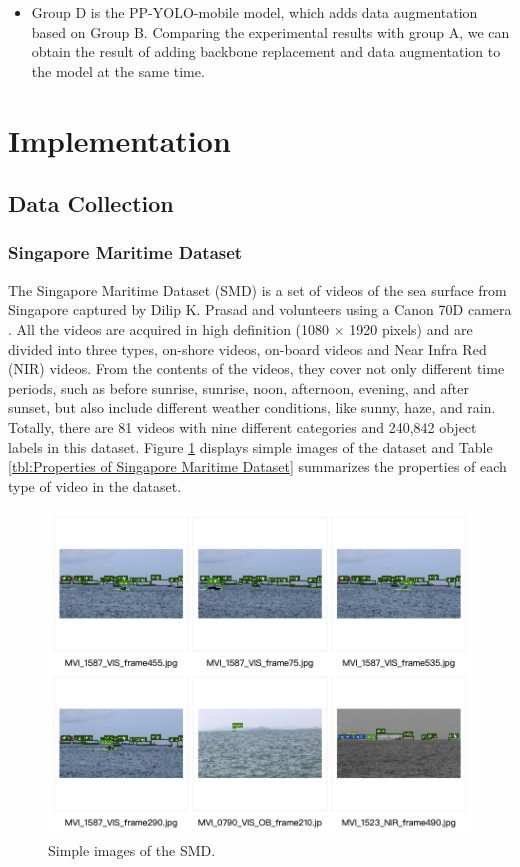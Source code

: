 \documentclass[sensors,article,submit,moreauthors,pdftex]{Definitions/mdpi}
\begin{document}
\begin{paracol}{2}
\begin{itemize}
\item{Group D is the PP-YOLO-mobile model, which adds data augmentation based on Group B. Comparing the experimental results with group A, we can obtain the result of adding backbone replacement and data augmentation to the model at the same time.}
\end{itemize}


\section{Implementation}
\subsection{Data Collection}

\subsubsection{Singapore Maritime Dataset}
The Singapore Maritime Dataset (SMD) is a set of videos of the sea surface from Singapore captured by Dilip K. Prasad and volunteers using a Canon 70D camera \cite{prasad2017video}. All the videos are acquired in high definition (1080 $\times$ 1920 pixels) and are divided into three types, on-shore videos, on-board videos and Near Infra Red (NIR) videos. From the contents of the videos, they cover not only different time periods, such as before sunrise, sunrise, noon, afternoon, evening, and after sunset, but also include different weather conditions, like sunny, haze, and rain. Totally, there are 81 videos with nine different categories and 240,842 object labels in this dataset. Figure \ref{fig:Simple images of the SMD} displays simple images of the dataset and Table \ref{tbl:Properties of Singapore Maritime Dataset} summarizes the properties of each type of video in the dataset.


\begin{figure}[htbp]
\centering
\includegraphics[width=1\columnwidth]{images/SMD-example.png}
\caption{Simple images of the SMD.}
\label{fig:Simple images of the SMD}
\end{figure}


\end{paracol}
\end{document}
